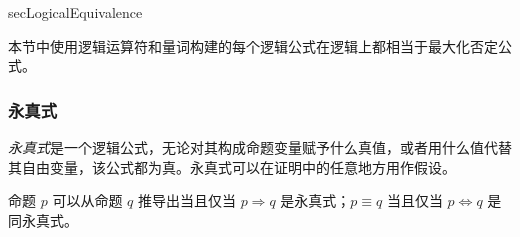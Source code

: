 \begin{tldr}{secLogicalEquivalence}
\begin{tldrlist}
本节中使用逻辑运算符和量词构建的每个逻辑公式在逻辑上都相当于最大化否定公式。
\end{tldrlist}

\subsubsection*{永真式}

\begin{tldrlist}
\textit{永真式}是一个逻辑公式，无论对其构成命题变量赋予什么真值，或者用什么值代替其自由变量，该公式都为真。永真式可以在证明中的任意地方用作假设。

命题 $p$ 可以从命题 $q$ 推导出当且仅当 $p \Rightarrow q$ 是永真式；$p \equiv q$ 当且仅当 $p \Leftrightarrow q$ 是同永真式。
\end{tldrlist}
\end{tldr}